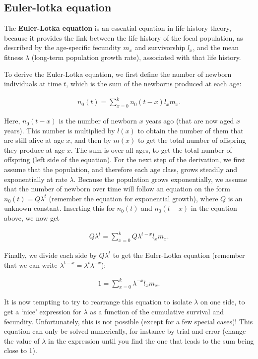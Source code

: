 \documentclass[
]{book}
\begin{document}
\hypertarget{Euler}{%
\subsection{Euler-lotka equation}\label{Euler}}

The \textbf{Euler-Lotka equation} is an essential equation in life history theory, because it provides the link between the life history of the focal population, as described by the age-specific fecundity \(m_x\) and survivorship \(l_x\), and the mean fitness \(\lambda\) (long-term population growth rate), associated with that life history.

To derive the Euler-Lotka equation, we first define the number of newborn individuals at time \(t\), which is the sum of the newborns produced at each age:

\begin{align}
n_0(t)=\sum_{x=0}^{k}n_0(t-x)l_xm_x.
\label{eq:Euler1}
\end{align}

Here, \(n_0(t-x)\) is the number of newborn \(x\) years ago (that are now aged \(x\) years). This number is multiplied by \(l(x)\) to obtain the number of them that are still alive at age \(x\), and then by \(m(x)\) to get the total number of offspring they produce at age \(x\). The sum is over all ages, to get the total number of offspring (left side of the equation). For the next step of the derivation, we first assume that the population, and therefore each age class, grows steadily and exponentially at rate \(\lambda\). Because the population grows exponentially, we assume that the number of newborn over time will follow an equation on the form \(n_0(t)=Q\lambda^t\) (remember the equation for exponential growth), where \(Q\) is an unknown constant. Inserting this for \(n_0(t)\) and \(n_0(t-x)\) in the equation above, we now get

\begin{align}
Q\lambda^{t}=\sum_{x=0}^{k}Q\lambda^{t-x}l_xm_x.
\label{eq:Euler2}
\end{align}

Finally, we divide each side by \(Q\lambda^t\) to get the Euler-Lotka equation (remember that we can write \(\lambda^{t-x}=\lambda^{t}\lambda^{-x}\)):

\begin{align}
1=\sum_{x=0}^{k}\lambda^{-x}l_xm_x.
\label{eq:Euler}
\end{align}

It is now tempting to try to rearrange this equation to isolate \(\lambda\) on one side, to get a `nice' expression for \(\lambda\) as a function of the
cumulative survival and fecundity. Unfortunately, this is not possible (except for a few special cases)! This equation can only be solved numerically, for instance by trial and error (change the value of \(\lambda\) in the expression until you find the one that leads to the sum being close to 1).
\end{document}
